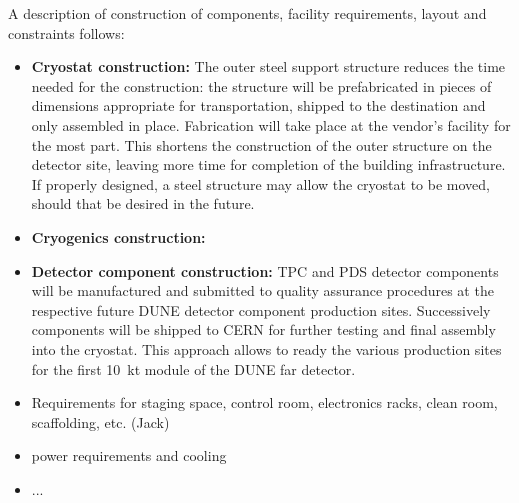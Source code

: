 \label{nuplatform}

A description of construction of components, facility requirements, layout and constraints follows:


\begin{itemize}

\item {\bf Cryostat construction:}
The outer steel support structure reduces the time needed for the construction: the structure will be prefabricated in pieces of dimensions appropriate for transportation, shipped to the destination and only assembled in place. Fabrication will take place at the vendor's facility for the most part. This shortens the construction of the outer structure on the detector site, leaving more time for completion of the building infrastructure. If properly designed, a steel structure may allow the cryostat to be moved, should that be desired in the future.

\item {\bf Cryogenics construction:}

\item {\bf Detector component construction:} 
TPC and PDS detector components will be manufactured and submitted to quality assurance procedures at the respective future DUNE detector component production sites. Successively components will be shipped to CERN for further testing and final assembly into the cryostat. This approach allows to ready the various production sites for the first 10~kt module of the DUNE far detector.


\item Requirements for staging space, control room, electronics racks, clean room, scaffolding, etc. (Jack)

\item power requirements and cooling 

\item ...

\end{itemize}



